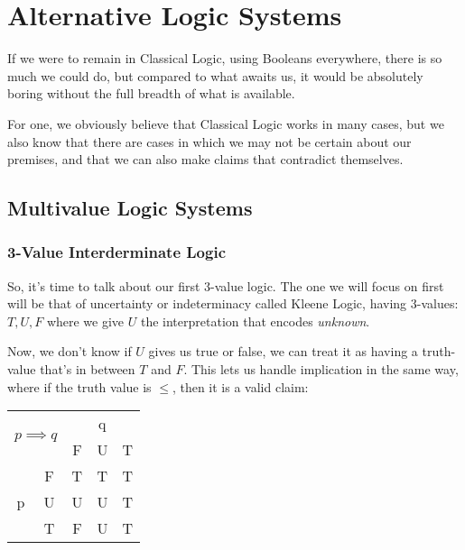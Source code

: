 \chapter{Alternative Logic Systems}
If we were to remain in Classical Logic, using Booleans everywhere, there is so much we could do, but compared to what awaits us, it would be absolutely boring without the full breadth of what is available.

For one, we obviously believe that Classical Logic works in many cases, but we also know that there are cases in which we may not be certain about our premises, and that we can also make claims that contradict themselves.

\section{Multivalue Logic Systems}
\subsection{3-Value Interderminate Logic}
So, it's time to talk about our first 3-value logic. The one we will focus on first will be that of uncertainty or indeterminacy called Kleene Logic, having 3-values: $T, U, F$ where we give $U$ the interpretation that encodes \emph{unknown}.

Now, we don't know if $U$ gives us true or false, we can treat it as having a truth-value that's in between $T$ and $F$. This lets us handle implication in the same way, where if the truth value is $\leq$, then it is a valid claim:

\begin{table}[ht]
\centering
\begin{tabular}{|c|c|c|c|c|}
\hline
\multicolumn{2}{|c|}{\multirow{2}{*}{$p \implies q$}} & \multicolumn{3}{c|}{q} \\ \cline{3-5} 
\multicolumn{2}{|c|}{}                        & F      & U     & T     \\ \hline
\multirow{3}{*}{p}             & F            & T      & T     & T     \\ \cline{2-5} 
                               & U            & U      & U     & T     \\ \cline{2-5} 
                               & T            & F      & U     & T     \\ \hline
\end{tabular}
\end{table}

